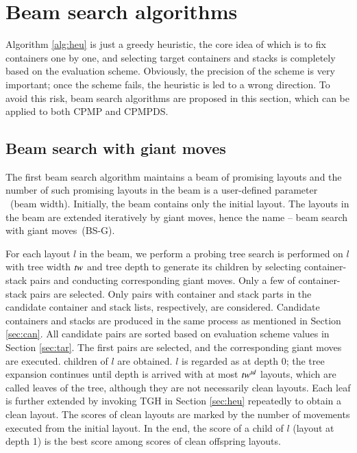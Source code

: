 \documentclass[review,3p,times,authoryear,12pt]{elsarticle}
\begin{document}
\section{Beam search algorithms}
\label{sec:g2la}

Algorithm \ref{alg:heu} is just a greedy heuristic, the core idea of which is to fix containers one by one, and selecting target containers and stacks is completely based on the evaluation scheme.
Obviously, the precision of the scheme is very important; once the scheme fails, the heuristic is led to a wrong direction. To avoid this risk, beam search algorithms are proposed in this section, which can be applied to both CPMP and CPMPDS.

\subsection{Beam search with giant moves}

The first beam search algorithm maintains a beam of promising layouts and the number of such promising layouts in the beam is a user-defined parameter ~(beam width). Initially, the beam contains only the initial layout. The layouts in the beam are extended iteratively by giant moves, hence the name -- beam search with giant moves~(BS-G).

For each layout $l$ in the beam, we perform a probing tree search is performed on $l$ with tree width $\id{tw}$ and tree depth  to generate its children by selecting container-stack pairs and conducting corresponding giant moves. Only a few of container-stack pairs are selected. Only pairs with container and stack parts in the candidate container and stack lists, respectively, are considered. Candidate containers and stacks are produced in the same process as mentioned in Section \ref{sec:can}. All candidate pairs are sorted based on evaluation scheme values in Section \ref{sec:tar}. The first  pairs are selected, and the corresponding giant moves are executed.  children of $l$ are obtained. $l$ is regarded as at depth 0; the tree expansion continues until depth  is arrived with at most $\id{tw}^\id{td}$ layouts, which are called leaves of the tree, although they are not necessarily clean layouts. Each leaf is further extended by invoking TGH in Section \ref{sec:heu} repeatedly to obtain a clean layout. The scores of clean layouts are marked by the number of movements executed from the initial layout. In the end, the score of a child of $l$ (layout at depth 1) is the best score among scores of clean offspring layouts.
\end{document}
